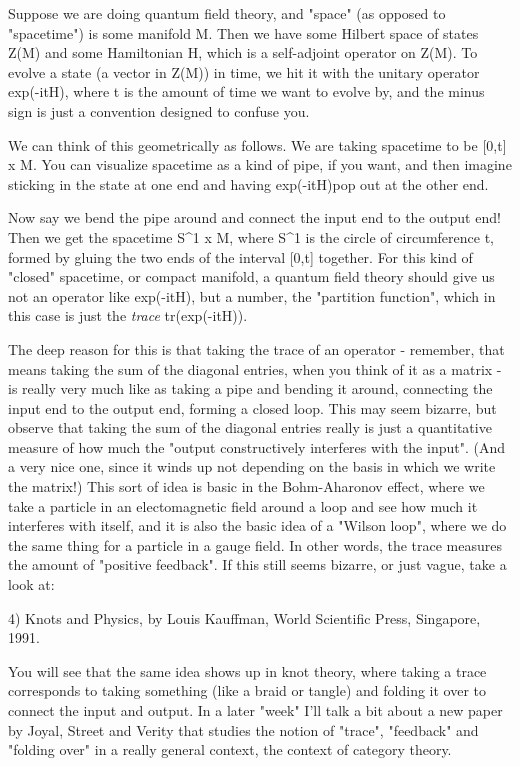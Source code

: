 Suppose we are doing quantum field theory, and "space" (as opposed
to "spacetime") is some manifold M.  Then we have some Hilbert space
of states Z(M) and some Hamiltonian H, which is a self-adjoint operator 
on Z(M).  To evolve a state (a vector in Z(M)) in time, we hit it with
the unitary operator exp(-itH), where t is the amount of time we want 
to evolve by, and the minus sign is just a convention designed to confuse 
you.
  
We can think of this geometrically as follows.  We are taking spacetime to
be [0,t] x M.  You can visualize spacetime as a kind of pipe, if you 
want, and then imagine sticking in the state \psi  at one end and 
having exp(-itH)\psi  pop out at the other end.

Now say we bend the pipe around and connect the input end to 
the output end!  Then we get the spacetime S^{1} x M, where 
S^{1}
is the circle of circumference t, formed by gluing the two ends of the
interval [0,t] together.  For this kind of "closed" spacetime,
or compact manifold, a quantum field theory should give us not
an operator like exp(-itH), but a number, the "partition function",
which in this case is just the \emph{trace} tr(exp(-itH)).  

The deep reason for this is that taking the trace of an operator - 
remember, that means taking the sum of the diagonal entries, when 
you think of it as a matrix - is really very much like as taking 
a pipe and bending it around, connecting the input end to the output 
end, forming a closed loop.  This may seem bizarre, but observe 
that taking the sum of the diagonal entries really is just a 
quantitative measure of how much the "output constructively interferes
with the input".  (And a very nice one, since it winds up not
depending on the basis in which we write the matrix!)  This sort of
idea is basic in the Bohm-Aharonov effect, where we take a particle
in an electomagnetic field around a loop and see how much it interferes 
with itself, and it is also the basic idea of a "Wilson loop", where
we do the same thing for a particle in a gauge field.  In other words,
the trace measures the amount of "positive feedback".  If this still
seems bizarre, or just vague, take a look at:

4) Knots and Physics, by Louis Kauffman, World Scientific
Press, Singapore, 1991.

You will see that the same idea shows up in knot theory, where 
taking a trace corresponds to taking something (like a braid or tangle) 
and folding it over to connect the input and output.  In a later "week" I'll 
talk a bit about a new paper by Joyal, Street and Verity that
studies the notion of "trace", "feedback" and "folding over" in a 
really general context, the context of category theory.

